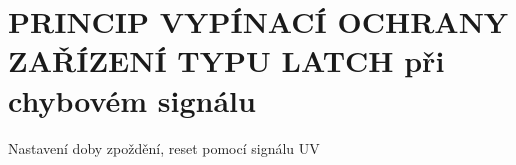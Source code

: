 \section{PRINCIP VYPÍNACÍ OCHRANY ZAŘÍZENÍ TYPU LATCH při chybovém signálu}
Nastavení doby zpoždění, reset pomocí signálu UV